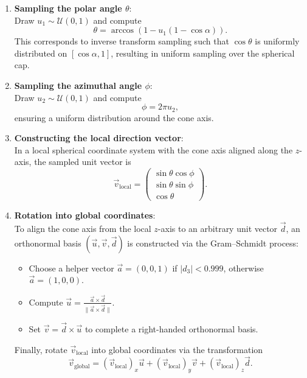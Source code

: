 \begin{enumerate}
    \item \textbf{Sampling the polar angle $\theta$}:\\
    Draw $u_1 \sim \mathcal{U}(0,1)$ and compute
    \[
        \theta = \arccos\left(1 - u_1 (1 - \cos \alpha)\right).
    \]
    This corresponds to inverse transform sampling such that $\cos\theta$ is
    uniformly distributed on $[\cos\alpha, 1]$, resulting in uniform sampling
    over the spherical cap.

    \item \textbf{Sampling the azimuthal angle $\phi$}:\\
    Draw $u_2 \sim \mathcal{U}(0,1)$ and compute
    \[
        \phi = 2\pi u_2,
    \]
    ensuring a uniform distribution around the cone axis.

    \item \textbf{Constructing the local direction vector}:\\
    In a local spherical coordinate system with the cone axis aligned along the
    $z$-axis, the sampled unit vector is
    \[
        \vec{v}_{\text{local}} =
        \begin{pmatrix}
            \sin\theta \cos\phi \\
            \sin\theta \sin\phi \\
            \cos\theta
        \end{pmatrix}.
    \]

    \item \textbf{Rotation into global coordinates}:\\
    To align the cone axis from the local $z$-axis to an arbitrary unit vector
    $\vec{d}$, an orthonormal basis $(\vec{u}, \vec{v}, \vec{d})$ is constructed
    via the Gram–Schmidt process:
    \begin{itemize}
        \item Choose a helper vector $\vec{a} = (0,0,1)$ if $|d_3| < 0.999$,
        otherwise $\vec{a} = (1,0,0)$.
        \item Compute $\vec{u} = \frac{\vec{a} \times \vec{d}}{\|\vec{a} \times
        \vec{d}\|}$.
        \item Set $\vec{v} = \vec{d} \times \vec{u}$ to complete a right-handed
        orthonormal basis.
    \end{itemize}
    Finally, rotate $\vec{v}_{\text{local}}$ into global coordinates via the
    transformation
    \[
        \vec{v}_{\text{global}} = (\vec{v}_{\text{local}})_x \vec{u} + (\vec{v}_{\text{local}})_y \vec{v} + (\vec{v}_{\text{local}})_z \vec{d}.
    \]
\end{enumerate}


